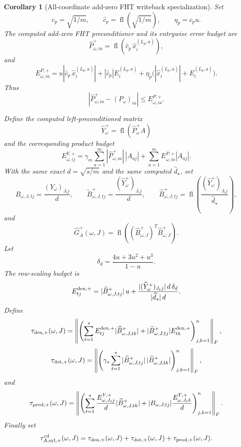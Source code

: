 \documentclass[11pt]{article}
\newcommand{\fl}{\operatorname{fl}}
\newtheorem{corollary}[theorem]{Corollary}
\theoremstyle{remark}
\begin{document}
\begin{corollary}[All-coordinate add-zero FHT writeback specialization]
Set
\[
  c_p=\sqrt{1/m},\qquad
  \widehat c_p=\fl(\sqrt{1/m}),\qquad
  \eta_p=c_pu .
\]
The computed add-zero FHT preconditioner and its entrywise error budget are
\[
  \widehat P^+_{\omega,ia}
  =
  \fl\!\left(\widehat c_p\,\widehat x_i^{(L_p,a)}\right),
\]
and
\[
  E^{P,+}_{\omega,ia}
  =
  u|\widehat c_p\,\widehat x_i^{(L_p,a)}|
  +
  |\widehat c_p|E_i^{(L_p,a)}
  +
  \eta_p\bigl(|\widehat x_i^{(L_p,a)}|+E_i^{(L_p,a)}\bigr).
\]
Thus
\[
  |\widehat P^+_{\omega,ia}-(P_\omega)_{ia}|
  \le E^{P,+}_{\omega,ia}.
\]

Define the computed left-preconditioned matrix
\[
  \widehat Y^+_{\omega}=\fl(\widehat P^+_{\omega}A)
\]
and the corresponding product budget
\[
  E^{Y,+}_{\omega,ij}
  =
  \gamma_m\sum_{a=1}^m
    |\widehat P^+_{\omega,ia}|\,|A_{aj}|
  +
  \sum_{a=1}^m E^{P,+}_{\omega,ia}|A_{aj}|.
\]
With the same exact \(d=\sqrt{s/m}\) and the same computed
\(\widehat d_\star\), set
\[
  B_{\omega,J,tj}=\frac{(Y_\omega)_{J_tj}}{d},
  \qquad
  \widetilde B^+_{\omega,J,tj}
    =
    \frac{(\widehat Y^+_\omega)_{J_tj}}{d},
  \qquad
  \widehat B^+_{\omega,J,tj}
    =
    \fl\!\left(\frac{(\widehat Y^+_\omega)_{J_tj}}{\widehat d_\star}\right),
\]
and
\[
  \widehat G_A^+(\omega,J)
  =
  \fl\!\left((\widehat B^+_{\omega,J})^T\widehat B^+_{\omega,J}\right).
\]
Let
\[
  \delta_d=\frac{4u+3u^2+u^3}{1-u}.
\]
The row-scaling budget is
\[
  E^{{\rm den},+}_{tj}
  =
  |\widehat B^+_{\omega,J,tj}|\,u
  +
  \frac{|(\widehat Y^+_\omega)_{J_tj}|\,d\,\delta_d}
       {|\widehat d_\star|\,d}.
\]
Define
\[
  \tau_{{\rm den},+}(\omega,J)
  =
  \left\|
    \left(
      \sum_{t=1}^s
      E^{{\rm den},+}_{tj}|\widehat B^+_{\omega,J,tk}|
      +
      |\widetilde B^+_{\omega,J,tj}|E^{{\rm den},+}_{tk}
    \right)_{j,k=1}^n
  \right\|_F,
\]
\[
  \tau_{{\rm dot},+}(\omega,J)
  =
  \left\|
    \left(
      \gamma_s
      \sum_{t=1}^s
      |\widehat B^+_{\omega,J,tj}|\,|\widehat B^+_{\omega,J,tk}|
    \right)_{j,k=1}^n
  \right\|_F,
\]
and
\[
  \tau_{{\rm prod},+}(\omega,J)
  =
  \left\|
    \left(
      \sum_{t=1}^s
      \frac{E^{Y,+}_{\omega,J_tj}}{d}
        |\widetilde B^+_{\omega,J,tk}|
      +
      |B_{\omega,J,tj}|
      \frac{E^{Y,+}_{\omega,J_tk}}{d}
    \right)_{j,k=1}^n
  \right\|_F .
\]
Finally set
\[
  \tau_{A,{\rm syl},+}^{\rm cd}(\omega,J)
  =
  \tau_{{\rm den},+}(\omega,J)
  +
  \tau_{{\rm dot},+}(\omega,J)
  +
  \tau_{{\rm prod},+}(\omega,J).
\]


\end{corollary}
\end{document}
